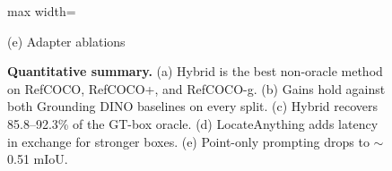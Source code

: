 \begin{figure}[!t]
  \begin{minipage}[t]{0.55\textwidth}
    \centering
    \begin{adjustbox}{max width=\linewidth}
    \end{adjustbox}
    \par\vspace{0.15em}(e) Adapter ablations
  \end{minipage}
  \caption{%
    \textbf{Quantitative summary.}
    (a) Hybrid is the best non-oracle method on RefCOCO, RefCOCO+, and RefCOCO-g.
    (b) Gains hold against both Grounding DINO baselines on every split.
    (c) Hybrid recovers 85.8--92.3\% of the GT-box oracle.
    (d) LocateAnything adds latency in exchange for stronger boxes.
    (e) Point-only prompting drops to $\sim$0.51 mIoU.}
  \label{fig:results-panel}
\end{figure}

